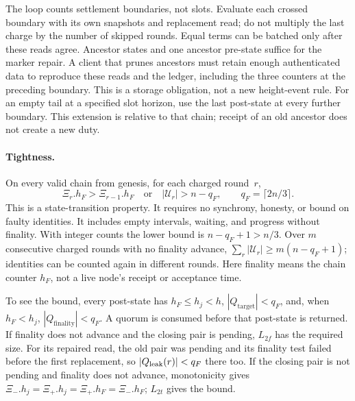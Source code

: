 \documentclass{article}
\theoremstyle{plain}
\theoremstyle{definition}
\theoremstyle{remark}
\newcommand{\Qtarget}{Q_{\mathrm{target}}}
\newcommand{\Qfin}{Q_{\mathrm{finality}}}
\begin{document}
The loop counts settlement boundaries, not slots.  Evaluate each crossed
boundary with its own snapshots and replacement read; do not multiply
the last charge by the number of skipped rounds.  Equal terms can be
batched only after these reads agree.  Ancestor states and one ancestor
pre-state suffice for the marker repair.  A client that prunes ancestors
must retain enough authenticated data to reproduce these reads and the
ledger, including the three counters at the preceding boundary.
This is a storage obligation, not a new height-event rule.
For an empty tail at a specified slot horizon, use the last post-state
at every further boundary.  This extension is relative to that chain;
receipt of an old ancestor does not create a new duty.

\paragraph{Tightness.}
On every valid chain from genesis, for each charged round~$r$,
\[
 \Xi_r.h_F>\Xi_{r-1}.h_F\quad\text{or}\quad
 |\mathcal U_r|>n-q_F,\qquad q_F=\lceil2n/3\rceil.
\]
This is a state-transition property.  It requires no synchrony, honesty,
or bound on faulty identities.  It includes empty intervals, waiting,
and progress without finality.  With integer counts the lower bound is
$n-q_F+1>n/3$.  Over $m$ consecutive charged rounds with no finality
advance, $\sum_r|\mathcal U_r|\geq m(n-q_F+1)$; identities can be counted again
in different rounds.  Here finality means the chain counter $h_F$,
not a live node's receipt or acceptance time.

To see the bound, every post-state has
$h_F\leq h_j<h$, $|\Qtarget|<q_F$, and, when $h_F<h_j$,
$|\Qfin|<q_F$.  A quorum is consumed before that post-state is returned.
If finality does not advance and the closing pair is pending, $L_{2f}$
has the required size.  For its repaired read, the old pair was pending
and its finality test failed before the first replacement, so
$|Q_{\rm leak}(r)|<q_F$ there too.  If the closing pair is not pending and finality does not advance,
monotonicity gives $\Xi_-.h_j=\Xi_+.h_j=\Xi_+.h_F=\Xi_-.h_F$; $L_{2t}$ gives the bound.
\end{document}
